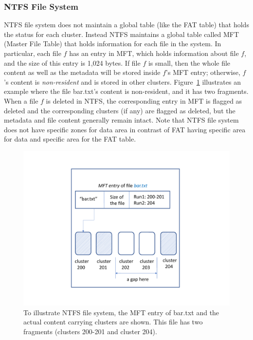 \subsubsection{NTFS File System} \label{subsubsec:ntfs-overview}

NTFS file system does not maintain a global table (like the FAT table) 
that holds the status for each cluster. Instead NTFS maintains a global table called 
MFT (Master File Table) that
holds information for each file in the system. In particular, each file $f$ has an 
entry in MFT, which holds information about file $f$, and the size of this entry is 1,024 bytes.  
If file $f$ is small, then the whole file content as well as the metadata will be stored
inside $f$'s MFT entry; 
otherwise, $f$'s content is \emph{non-resident} and is stored in other clusters. 
Figure~\ref{fig:ntfs} illustrates an example where the file bar.txt's content is non-resident, 
and it has two fragments. When a file $f$ is deleted in NTFS, 
the corresponding entry in MFT is flagged as deleted and the corresponding clusters 
(if any) are flagged as deleted, but the metadata and file content generally remain intact.
Note that NTFS file system does not have specific zones for data area in contrast of 
FAT having specific area for data and specific area for the FAT table.


 \begin{figure}[h]
     \centering
     \includegraphics[width=\linewidth]{fig/ntfs.pdf}
     \caption{To illustrate NTFS file system, the MFT entry of bar.txt and the actual content carrying clusters are shown. 
 This file has two fragments (clusters 200-201 and cluster 204).}
     \label{fig:ntfs}
 \end{figure}
 

